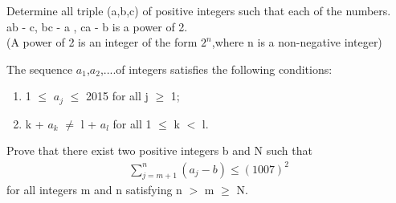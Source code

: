 \item Determine all triple (a,b,c) of positive integers such that each of the numbers.\\
ab - c, bc - a , ca - b is a power of 2.\\
(A power of 2 is an integer of the form $2^n$,where n is a non-negative integer)

\item The sequence $a_1$,$a_2$,....of integers satisfies the following conditions:
\begin{enumerate}
\item 1 $\leq$ $a_j$ $\leq$ 2015 for all j $\geq$ 1;
\item k + $a_k$ $\neq$ l + $a_l$ for all 1 $\leq$ k $<$ l.
\end{enumerate}
Prove that there exist two positive integers b and N such that
\begin{align*}
\sum_{j=m+1}^n (a_j-b) \leq (1007)^2
\end{align*}
for all integers m and n satisfying n $>$ m $\geq$ N.


